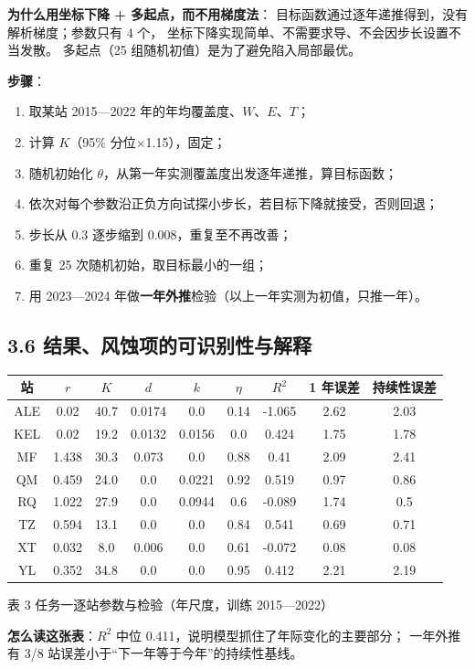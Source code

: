 \documentclass[11pt,a4paper]{ctexart}
\begin{document}
\textbf{为什么用坐标下降 + 多起点，而不用梯度法}：
目标函数通过逐年递推得到，没有解析梯度；参数只有 4 个，
坐标下降实现简单、不需要求导、不会因步长设置不当发散。
多起点（25 组随机初值）是为了避免陷入局部最优。

\textbf{步骤}：
\begin{enumerate}
\item 取某站 2015—2022 年的年均覆盖度、$W$、$E$、$T$；
\item 计算 $K$（95\% 分位×1.15），固定；
\item 随机初始化 $\theta$，从第一年实测覆盖度出发逐年递推，算目标函数；
\item 依次对每个参数沿正负方向试探小步长，若目标下降就接受，否则回退；
\item 步长从 0.3 逐步缩到 0.008，重复至不再改善；
\item 重复 25 次随机初始，取目标最小的一组；
\item 用 2023—2024 年做\textbf{一年外推}检验（以上一年实测为初值，只推一年）。
\end{enumerate}

\subsection*{3.6 结果、风蚀项的可识别性与解释}
\begin{table}[H]\centering\footnotesize
\begin{tabular}{|c|c|c|c|c|c|c|c|c|}
\toprule
站 & $r$ & $K$ & $d$ & $k$ & $\eta$ & $R^2$ & 1 年误差 & 持续性误差 \\
\midrule
ALE & 0.02 & 40.7 & 0.0174 & 0.0 & 0.14 & -1.065 & 2.62 & 2.03 \\
KEL & 0.02 & 19.2 & 0.0132 & 0.0156 & 0.0 & 0.424 & 1.75 & 1.78 \\
MF & 1.438 & 30.3 & 0.073 & 0.0 & 0.88 & 0.41 & 2.09 & 2.41 \\
QM & 0.459 & 24.0 & 0.0 & 0.0221 & 0.92 & 0.519 & 0.97 & 0.86 \\
RQ & 1.022 & 27.9 & 0.0 & 0.0944 & 0.6 & -0.089 & 1.74 & 0.5 \\
TZ & 0.594 & 13.1 & 0.0 & 0.0 & 0.84 & 0.541 & 0.69 & 0.71 \\
XT & 0.032 & 8.0 & 0.006 & 0.0 & 0.61 & -0.072 & 0.08 & 0.08 \\
YL & 0.352 & 34.8 & 0.0 & 0.0 & 0.95 & 0.412 & 2.21 & 2.19 \\
\bottomrule
\end{tabular}
\begin{center}\small 表 3  任务一逐站参数与检验（年尺度，训练 2015—2022）\end{center}
\end{table}
\textbf{怎么读这张表}：$R^2$ 中位 0.411，说明模型抓住了年际变化的主要部分；
一年外推有 3/8 站误差小于“下一年等于今年”的持续性基线。
\end{document}
